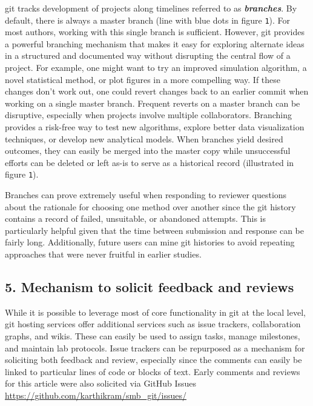 \documentclass[]{article}
\begin{document}
git tracks development of projects along timelines referred to as
\textbf{\emph{branches}}. By default, there is always a master branch
(line with blue dots in figure \texttt{1}). For most authors, working
with this single branch is sufficient. However, git provides a powerful
branching mechanism that makes it easy for exploring alternate ideas in
a structured and documented way without disrupting the central flow of a
project. For example, one might want to try an improved simulation
algorithm, a novel statistical method, or plot figures in a more
compelling way. If these changes don't work out, one could revert
changes back to an earlier commit when working on a single master
branch. Frequent reverts on a master branch can be disruptive,
especially when projects involve multiple collaborators. Branching
provides a risk-free way to test new algorithms, explore better data
visualization techniques, or develop new analytical models. When
branches yield desired outcomes, they can easily be merged into the
master copy while unsuccessful efforts can be deleted or left as-is to
serve as a historical record (illustrated in figure \texttt{1}).

Branches can prove extremely useful when responding to reviewer
questions about the rationale for choosing one method over another since
the git history contains a record of failed, unsuitable, or abandoned
attempts. This is particularly helpful given that the time between
submission and response can be fairly long. Additionally, future users
can mine git histories to avoid repeating approaches that were never
fruitful in earlier studies.

\subsection{5. Mechanism to solicit feedback and reviews}

While it is possible to leverage most of core functionality in git at
the local level, git hosting services offer additional services such as
issue trackers, collaboration graphs, and wikis. These can easily be
used to assign tasks, manage milestones, and maintain lab protocols.
Issue trackers can be repurposed as a mechanism for soliciting both
feedback and review, especially since the comments can easily be linked
to particular lines of code or blocks of text. Early comments and
reviews for this article were also solicited via GitHub Issues
\href{https://github.com/karthikram/smb\_git/issues/}{https://github.com/karthikram/smb\_git/issues/}
\end{document}
